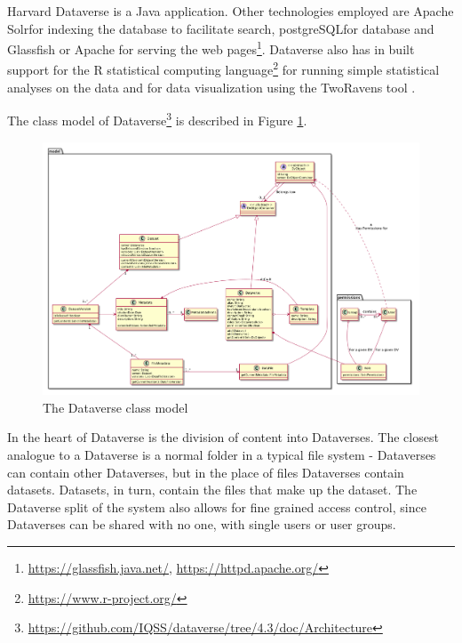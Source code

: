 Harvard Dataverse is a Java application. Other technologies employed are Apache
Solr for indexing the database to facilitate search,
postgreSQL for database
and Glassfish or Apache for serving the
web pages\footnote{\url{https://glassfish.java.net/}, \url{https://httpd.apache.org/}}.
Dataverse also has in built support for the R statistical computing
language\footnote{\url{https://www.r-project.org/}} for running simple
statistical analyses on the data and for data visualization using the
TwoRavens tool \cite{DBLP:conf/ht/HonakerD14}.

The class model of
Dataverse\footnote{\label{architecture}\url{https://github.com/IQSS/dataverse/tree/4.3/doc/Architecture}}
is described in Figure \ref{fig:dataverse-model}.

\begin{figure}
    \begin{centering}
        \includegraphics[width=\textwidth]{images/dataverse-model}
    \end{centering}
    \caption[The Dataverse class model]{The Dataverse class model}
    \label{fig:dataverse-model}
\end{figure}

In the heart of Dataverse is the division of content into Dataverses. The
closest analogue to a Dataverse is a normal folder in a typical file system -
Dataverses can contain other Dataverses, but in the place of files Dataverses
contain datasets. Datasets, in turn, contain the files that make up the
dataset. The Dataverse split of the system also allows for fine grained access
control, since Dataverses can be shared with no one, with single users or user
groups.

